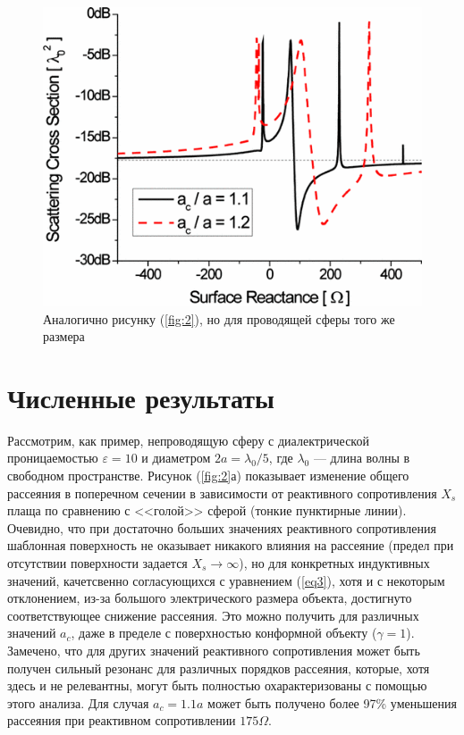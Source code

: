 \documentclass[12pt,a4paper]{article}
\begin{document}
\begin{figure}[t]
  \centering
  \includegraphics[height=0.15\paperheight, width=0.4\paperwidth]{4.png}
  \caption{Аналогично рисунку (\ref{fig:2}), но для проводящей сферы того же размера}
  \label{fig:4}
\end{figure}

\section{Численные результаты}
Рассмотрим, как пример, непроводящую сферу с диалектрической проницаемостью $\varepsilon=10$ 
и диаметром $2a=\lambda_0/5$, где $\lambda_0$ --- длина волны в свободном пространстве. 
Рисунок (\ref{fig:2}а) показывает изменение общего рассеяния в поперечном сечении в 
зависимости от реактивного сопротивления $X_s$ плаща по сравнению с <<голой>> сферой
(тонкие пунктирные линии). Очевидно, что при достаточно больших значениях реактивного 
сопротивления шаблонная поверхность не оказывает никакого влияния на рассеяние (предел при
отсутствии поверхности задается $X_s \to \infty$), но для конкретных индуктивных значений,
качетсвенно согласующихся с уравнением (\ref{eq3}), хотя и с некоторым отклонением, из-за
большого электрического размера объекта, достигнуто соответствующее снижение рассеяния.
Это можно получить для различных значений $a_c$, даже в пределе с поверхностью конформной
объекту ($\gamma=1$). Замечено, что для других значений реактивного сопротивления может
быть получен сильный резонанс для различных порядков рассеяния, которые, хотя здесь и не
релевантны, могут быть полностью охарактеризованы с помощью этого анализа. Для случая
$a_c=1.1a$ может быть получено более 97\% уменьшения рассеяния при реактивном сопротивлении
$175\Omega$.
\end{document}
